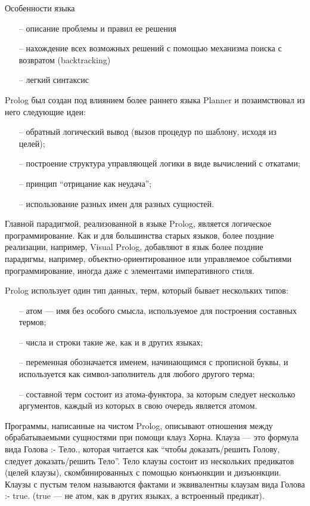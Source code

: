 Особенности языка

\begin{itemize}
    \item[--] описание проблемы и правил ее решения
    \item[--] нахождение всех возможных решений с помощью механизма поиска с возвратом (backtracking)
    \item[--] легкий синтаксис
\end{itemize}
	
		Prolog был создан под влиянием более раннего языка Planner и позаимствовал из него следующие идеи:

		\begin{itemize}
			\item[--] обратный логический вывод (вызов процедур по шаблону, исходя из целей);
			\item[--] построение структура управляющей логики в виде вычислений с откатами;
			\item[--] принцип “отрицание как неудача”;
			\item[--] использование разных имен для разных сущностей.
		\end{itemize}

		Главной парадигмой, реализованной в языке Prolog, является логическое программирование.
			Как и для большинства старых языков, более поздние реализации, например, Visual Prolog,
			добавляют в язык более поздние парадигмы, например, объектно-ориентированное или управляемое
			событиями программирование, иногда даже с элементами императивного стиля.

		Prolog использует один тип данных, терм, который бывает нескольких типов:

		\begin{itemize}
			\item[--] атом — имя без особого смысла, используемое для построения составных термов;
			\item[--] числа и строки такие же, как и в других языках;
			\item[--] переменная обозначается именем, начинающимся с прописной буквы,
				и используется как символ-заполнитель для любого другого терма;
			\item[--] составной терм состоит из атома-функтора, за которым следует несколько аргументов,
				каждый из которых в свою очередь является атомом.
		\end{itemize}

		Программы, написанные на чистом Prolog, описывают отношения между обрабатываемыми сущностями при помощи клауз Хорна. Клауза — это формула вида Голова :- Тело., которая читается как “чтобы доказать/решить Голову, следует доказать/решить Тело”. Тело клаузы состоит из нескольких предикатов (целей клаузы), скомбинированных с помощью конъюнкции и дизъюнкции. Клаузы с пустым телом называются фактами и эквивалентны клаузам вида Голова :- true. (true — не атом, как в других языках, а встроенный предикат).

